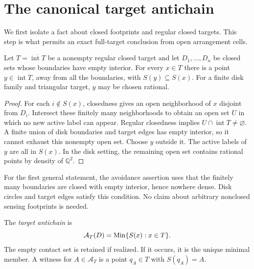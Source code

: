 \section{The canonical target antichain}
\label{sec:universal}
We first isolate a fact about closed footprints and regular closed targets. This step is what permits an exact full-target conclusion from open arrangement cells.

\begin{lemma}\label{lem:interior-witness}
Let $T=\overline{\operatorname{int}T}$ be a nonempty regular closed target and let $D_1,\ldots,D_n$ be closed sets whose boundaries have empty interior. For every $x\in T$ there is a point $y\in\operatorname{int}T$, away from all the boundaries, with $S(y)\subseteq S(x)$. For a finite disk family and triangular target, $y$ may be chosen rational.
\end{lemma}
\begin{proof}
For each $i\notin S(x)$, closedness gives an open neighborhood of $x$ disjoint from $D_i$. Intersect these finitely many neighborhoods to obtain an open set $U$ in which no new active label can appear. Regular closedness implies $U\cap\operatorname{int}T\ne\varnothing$. A finite union of disk boundaries and target edges has empty interior, so it cannot exhaust this nonempty open set. Choose $y$ outside it. The active labels of $y$ are all in $S(x)$. In the disk setting, the remaining open set contains rational points by density of $\mathbb Q^2$.
\end{proof}

For the first general statement, the avoidance assertion uses that the finitely many boundaries are closed with empty interior, hence nowhere dense. Disk circles and target edges satisfy this condition. No claim about arbitrary nonclosed sensing footprints is needed.

\begin{definition}
The \emph{target antichain} is
\[
\mathcal A_T(D)=\operatorname{Min}\{S(x):x\in T\}.
\]
The empty contact set is retained if realized. If it occurs, it is the unique minimal member. A witness for $A\in\mathcal A_T$ is a point $q_A\in T$ with $S(q_A)=A$.
\end{definition}

